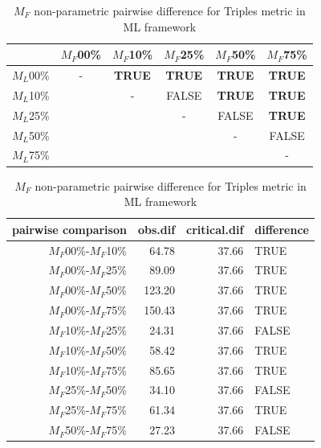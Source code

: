 \documentclass[12pt,letterpaper]{article}
\begin{document}
\begin{table}
\caption{$M_F$ non-parametric pairwise difference for Triples metric in ML framework} %
\centering
\begin{tabular}{c|ccccc}
    \hline
              & $M_F$00\% & $M_F$10\% & $M_F$25\% & $M_F$50\% & $M_F$75\% \\
    \hline
    $M_L$00\% & - & \textbf{TRUE} & \textbf{TRUE} & \textbf{TRUE} & \textbf{TRUE}\\
    $M_L$10\% & & - & FALSE & \textbf{TRUE} & \textbf{TRUE} \\
    $M_L$25\% & & & - & FALSE & \textbf{TRUE} \\
    $M_L$50\% & & & & - & FALSE \\
    $M_L$75\% & & & & & - \\
    \hline
\end{tabular}
\centering
\begin{tabular}{rrrl}
 pairwise comparison & obs.dif & critical.dif & difference \\ 
  \hline
  $M_F$00\%-$M_F$10\% & 64.78 & 37.66 & TRUE \\ 
  $M_F$00\%-$M_F$25\% & 89.09 & 37.66 & TRUE \\ 
  $M_F$00\%-$M_F$50\% & 123.20 & 37.66 & TRUE \\ 
  $M_F$00\%-$M_F$75\% & 150.43 & 37.66 & TRUE \\ 
  $M_F$10\%-$M_F$25\% & 24.31 & 37.66 & FALSE \\ 
  $M_F$10\%-$M_F$50\% & 58.42 & 37.66 & TRUE \\ 
  $M_F$10\%-$M_F$75\% & 85.65 & 37.66 & TRUE \\ 
  $M_F$25\%-$M_F$50\% & 34.10 & 37.66 & FALSE \\ 
  $M_F$25\%-$M_F$75\% & 61.34 & 37.66 & TRUE \\ 
  $M_F$50\%-$M_F$75\% & 27.23 & 37.66 & FALSE \\ 
   \hline
\end{tabular}
\label{ML_Tr-MF_results}
\end{table}
\end{document}

